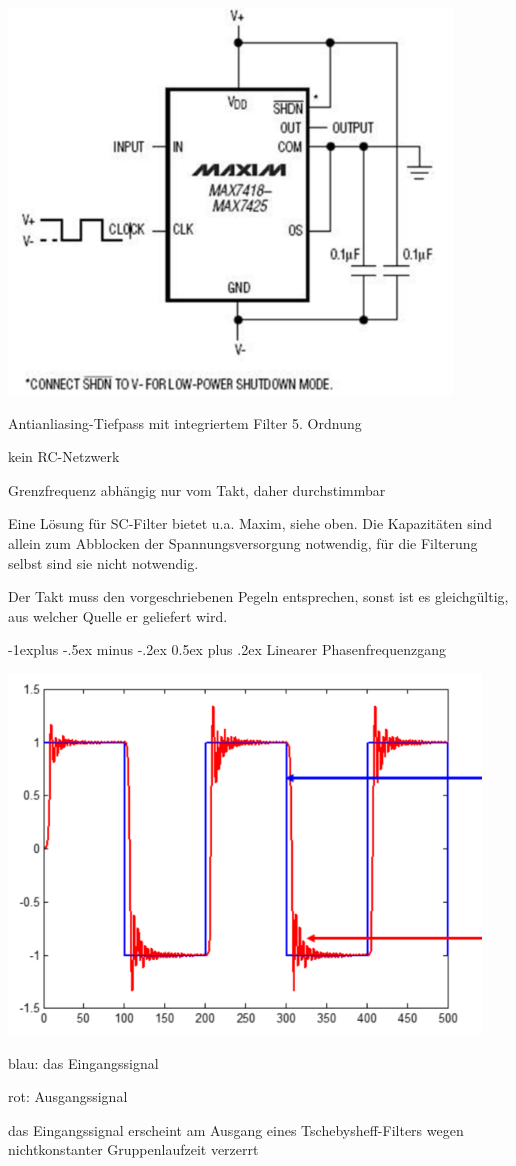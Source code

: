\documentclass[a4paper]{article}
\makeatletter
\renewcommand{\subsection}{\@startsection{subsection}{2}{0mm}%
 {-1explus -.5ex minus -.2ex}%
 {0.5ex plus .2ex}%
 {\normalfont\normalsize\bfseries}}
\makeatother
\begin{document}
\begin{multicols}{3}
\begin{itemize*}
    \item \includegraphics[width=.5\linewidth]{Assets/Biosignalverarbeitung-maxim7418.png}
    \begin{itemize*}
      \item Antianliasing-Tiefpass mit integriertem Filter 5. Ordnung
      \item kein RC-Netzwerk
      \item Grenzfrequenz abhängig nur vom Takt, daher durchstimmbar
      \item Eine Lösung für SC-Filter bietet u.a. Maxim, siehe oben. Die Kapazitäten sind allein zum Abblocken der Spannungsversorgung notwendig, für die Filterung selbst sind sie nicht notwendig.
      \item Der Takt muss den vorgeschriebenen Pegeln entsprechen, sonst ist es gleichgültig, aus welcher Quelle er geliefert wird.
    \end{itemize*}
  \end{itemize*}

  \subsection{Linearer Phasenfrequenzgang}\label{linearer-phasenfrequenzgang}

  \begin{itemize*}
    \item \includegraphics[width=.5\linewidth]{Assets/Biosignalverarbeitung-linearer-phasenfrequenzgang.png}
    \begin{itemize*}
      \item blau: das Eingangssignal
      \item rot: Ausgangssignal
      \item das Eingangssignal erscheint am Ausgang eines Tschebysheff-Filters wegen nichtkonstanter Gruppenlaufzeit verzerrt
    \end{itemize*}
  \end{itemize*}


\end{multicols}
\end{document}
